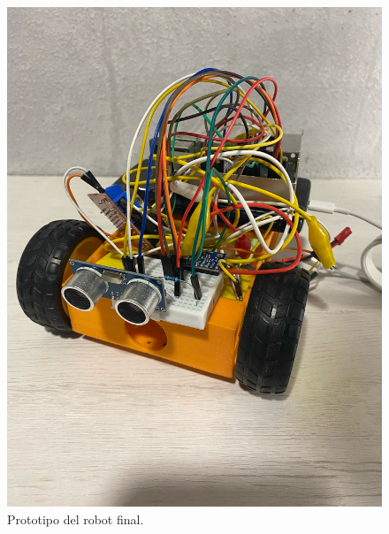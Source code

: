 \begin{figure}[H]
  \centering
  \includegraphics[scale=0.12]{figs/rob} %
  \caption{ Prototipo del robot final.}
  \label{fig:vals2}
\end{figure} 










